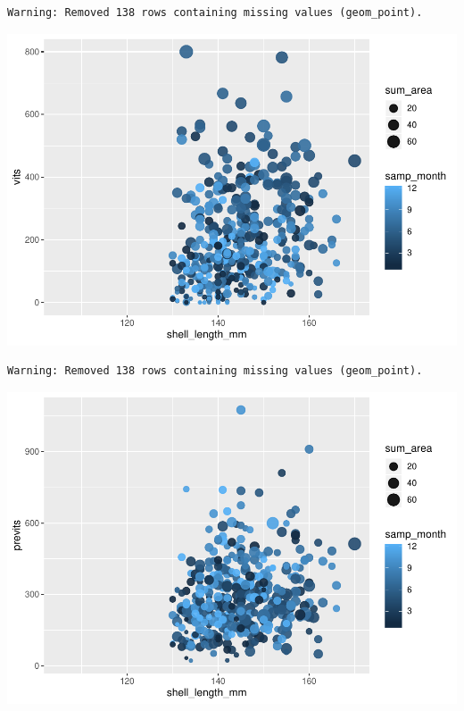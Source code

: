 \documentclass[]{article}
\newenvironment{Shaded}{\begin{snugshade}}{\end{snugshade}}
\newcommand{\DataTypeTok}[1]{\textcolor[rgb]{0.13,0.29,0.53}{#1}}
\newcommand{\FloatTok}[1]{\textcolor[rgb]{0.00,0.00,0.81}{#1}}
\newcommand{\KeywordTok}[1]{\textcolor[rgb]{0.13,0.29,0.53}{\textbf{#1}}}
\newcommand{\NormalTok}[1]{#1}
\newcommand{\OperatorTok}[1]{\textcolor[rgb]{0.81,0.36,0.00}{\textbf{#1}}}
\newcommand{\StringTok}[1]{\textcolor[rgb]{0.31,0.60,0.02}{#1}}
\begin{document}
\begin{verbatim}
Warning: Removed 138 rows containing missing values (geom_point).
\end{verbatim}

\includegraphics{AbRepro_files/figure-latex/simple plots-1.pdf}

\begin{Shaded}
\end{Shaded}

\begin{verbatim}
Warning: Removed 138 rows containing missing values (geom_point).
\end{verbatim}

\includegraphics{AbRepro_files/figure-latex/simple plots-2.pdf}
\end{document}
